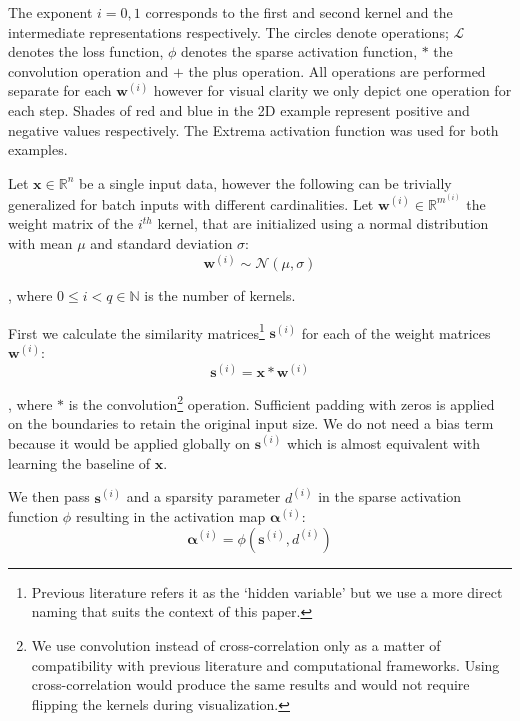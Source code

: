 \documentclass[journal]{IEEEtran}
\begin{document}
\begin{figure*}[!t]
{	The exponent $i=0,1$ corresponds to the first and second kernel and the intermediate representations respectively.
	The circles denote operations; $\mathcal{L}$ denotes the loss function, $\phi$ denotes the sparse activation function, $\ast$ the convolution operation and $+$ the plus operation.
	All operations are performed separate for each $\bm{w}^{(i)}$ however for visual clarity we only depict one operation for each step.
	Shades of red and blue in the 2D example represent positive and negative values respectively.
	The Extrema activation function was used for both examples.
	}
	\label{fig:sans}
\end{figure*}

Let $\bm{x} \in \mathbb{R}^n$ be a single input data, however the following can be trivially generalized for batch inputs with different cardinalities.
Let $\bm{w}^{(i)} \in \mathbb{R}^{m^{(i)}}$ the weight matrix of the $i^{th}$ kernel, that are initialized using a normal distribution with mean $\mu$ and standard deviation $\sigma$:
\begin{equation}
	\label{eq:weightinitialization}
	\bm{w}^{(i)} \sim \mathcal{N}(\mu, \sigma)
\end{equation}

\noindent
, where $0\le i < q \in \mathbb{N}$ is the number of kernels.

First we calculate the similarity matrices\footnote{Previous literature refers it as the `hidden variable' but we use a more direct naming that suits the context of this paper.} $\bm{s}^{(i)}$ for each of the weight matrices $\bm{w}^{(i)}$:
\begin{equation}
	\label{eq:similarity}
	\bm{s}^{(i)} = \bm{x} * \bm{w}^{(i)}
\end{equation}

\noindent
, where $*$ is the convolution\footnote{We use convolution instead of cross-correlation only as a matter of compatibility with previous literature and computational frameworks. Using cross-correlation would produce the same results and would not require flipping the kernels during visualization.} operation.
Sufficient padding with zeros is applied on the boundaries to retain the original input size.
We do not need a bias term because it would be applied globally on $\bm{s}^{(i)}$ which is almost equivalent with learning the baseline of $\bm{x}$.

We then pass $\bm{s}^{(i)}$ and a sparsity parameter $d^{(i)}$ in the sparse activation function $\phi$ resulting in the activation map $\bm{\alpha}^{(i)}$:
\begin{equation}
	\label{eq:extrema}
	\bm{\alpha}^{(i)} = \phi(\bm{s}^{(i)}, d^{(i)})
\end{equation}
\end{document}
